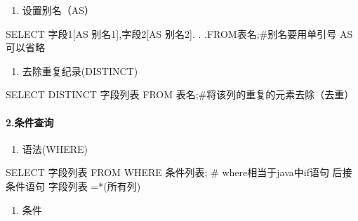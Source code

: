 \documentclass[
  letterpaper,
  DIV=11,
  numbers=noendperiod]{scrreprt}
\let\oldparagraph\paragraph
\renewcommand{\paragraph}[1]{\oldparagraph{#1}\mbox{}}
\newenvironment{Shaded}{\begin{snugshade}}{\end{snugshade}}
\newcommand{\KeywordTok}[1]{\textcolor[rgb]{0.00,0.23,0.31}{#1}}
\newcommand{\NormalTok}[1]{\textcolor[rgb]{0.00,0.23,0.31}{#1}}
\newcommand{\OperatorTok}[1]{\textcolor[rgb]{0.37,0.37,0.37}{#1}}
\providecommand{\tightlist}{%
  \setlength{\itemsep}{0pt}\setlength{\parskip}{0pt}}\usepackage{longtable,booktabs,array}
\begin{document}
\begin{enumerate}
\def\labelenumi{\arabic{enumi}.}
\setcounter{enumi}{1}
\tightlist
\item
  设置别名（AS）
\end{enumerate}

\begin{Shaded}
\begin{Highlighting}[]
\KeywordTok{SELECT}\NormalTok{ 字段1[}\KeywordTok{AS}\NormalTok{ 别名1],字段2[}\KeywordTok{AS}\NormalTok{ 别名2]. . .FROM表名;\#别名要用单引号 AS可以省略}
\end{Highlighting}
\end{Shaded}

\begin{enumerate}
\def\labelenumi{\arabic{enumi}.}
\setcounter{enumi}{2}
\tightlist
\item
  去除重复纪录(DISTINCT)
\end{enumerate}

\begin{Shaded}
\begin{Highlighting}[]
\KeywordTok{SELECT} \KeywordTok{DISTINCT}\NormalTok{ 字段列表 }\KeywordTok{FROM}\NormalTok{ 表名;\#将该列的重复的元素去除（去重）}
\end{Highlighting}
\end{Shaded}

\hypertarget{ux6761ux4ef6ux67e5ux8be2}{%
\paragraph{2.条件查询}\label{ux6761ux4ef6ux67e5ux8be2}}

\begin{enumerate}
\def\labelenumi{\arabic{enumi}.}
\tightlist
\item
  语法(WHERE)
\end{enumerate}

\begin{Shaded}
\begin{Highlighting}[]
\KeywordTok{SELECT}\NormalTok{ 字段列表 }\KeywordTok{FROM} \KeywordTok{WHERE}\NormalTok{ 条件列表; \# where相当于java中if语句 后接条件语句 字段列表 }\OperatorTok{=*}\NormalTok{(所有列)}
\end{Highlighting}
\end{Shaded}

\begin{enumerate}
\def\labelenumi{\arabic{enumi}.}
\setcounter{enumi}{1}
\tightlist
\item
  条件
\end{enumerate}
\end{document}
